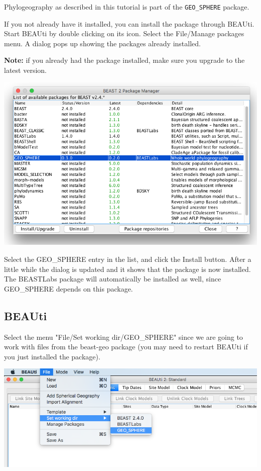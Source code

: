 \documentclass{article}
\def\beast-geo{GEO\_SPHERE}
\begin{document}
Phylogeography as described in this tutorial is part of the {\tt \beast-geo} package.

If you not already have it installed, you can install the package through BEAUti. Start BEAUti by double clicking on its icon. 
Select the File/Manage packages menu. A dialog pops up showing the packages already installed. 

{\bf Note:} if you already had the package installed, make sure you upgrade to the latest version.

\begin{center}
\includegraphics[scale=0.4]{figures/addonmgr.png}
\end{center}

Select the \beast-geo{} entry in the list, and click the Install button. After a little while the dialog is updated and it shows that the package is now installed. The BEASTLabs package will automatically be installed as well, since \beast-geo{} depends on this package.

\subsection*{BEAUti}

Select the menu "File/Set working dir/\beast-geo" since we are going to work with files from the beast-geo package (you may need to restart BEAUti if you just installed the package).

\begin{center}
\includegraphics[scale=0.4]{figures/BEAUti_setWD}
\end{center}
\end{document}
